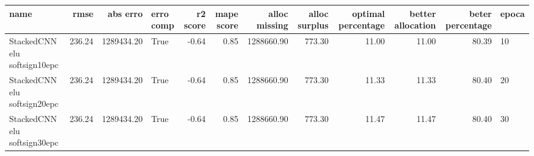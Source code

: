 \begin{tabular}{lrrlrrrrrrrl}
\toprule
name & rmse & abs erro & erro comp & r2 score & mape score & alloc missing & alloc surplus & optimal percentage & better allocation & beter percentage & epoca \\
\midrule
StackedCNN elu softsign10epc & 236.24 & 1289434.20 & True & -0.64 & 0.85 & 1288660.90 & 773.30 & 11.00 & 11.00 & 80.39 & 10 \\
StackedCNN elu softsign20epc & 236.24 & 1289434.20 & True & -0.64 & 0.85 & 1288660.90 & 773.30 & 11.33 & 11.33 & 80.40 & 20 \\
StackedCNN elu softsign30epc & 236.24 & 1289434.20 & True & -0.64 & 0.85 & 1288660.90 & 773.30 & 11.47 & 11.47 & 80.40 & 30 \\
\bottomrule
\end{tabular}
